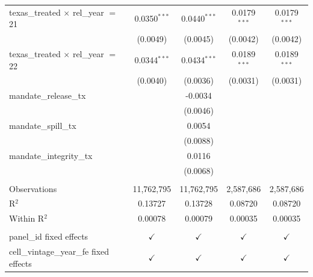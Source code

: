 \begin{tabular}{lcccc}
   texas\_treated $\times$ rel\_year $=$ 21     & 0.0350$^{***}$ & 0.0440$^{***}$  & 0.0179$^{***}$  & 0.0179$^{***}$\\   
                                                & (0.0049)       & (0.0045)        & (0.0042)        & (0.0042)\\   
   texas\_treated $\times$ rel\_year $=$ 22     & 0.0344$^{***}$ & 0.0434$^{***}$  & 0.0189$^{***}$  & 0.0189$^{***}$\\   
                                                & (0.0040)       & (0.0036)        & (0.0031)        & (0.0031)\\   
   mandate\_release\_tx                         &                & -0.0034         &                 &   \\   
                                                &                & (0.0046)        &                 &   \\   
   mandate\_spill\_tx                           &                & 0.0054          &                 &   \\   
                                                &                & (0.0088)        &                 &   \\   
   mandate\_integrity\_tx                       &                & 0.0116          &                 &   \\   
                                                &                & (0.0068)        &                 &   \\   
    \\
   Observations                                 & 11,762,795     & 11,762,795      & 2,587,686       & 2,587,686\\  
   R$^2$                                        & 0.13727        & 0.13728         & 0.08720         & 0.08720\\  
   Within R$^2$                                 & 0.00078        & 0.00079         & 0.00035         & 0.00035\\  
    \\
   panel\_id fixed effects                      & $\checkmark$   & $\checkmark$    & $\checkmark$    & $\checkmark$\\   
   cell\_vintage\_year\_fe fixed effects        & $\checkmark$   & $\checkmark$    & $\checkmark$    & $\checkmark$\\   
   \bottomrule
\end{tabular}
\par\endgroup


